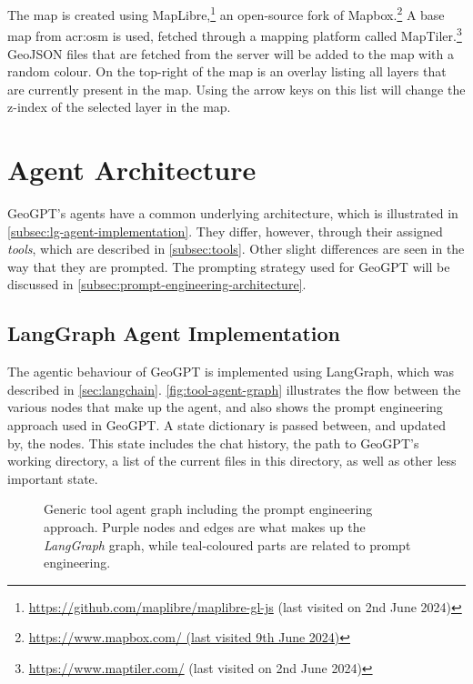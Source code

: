 The map is created using MapLibre,\footnote{\url{https://github.com/maplibre/maplibre-gl-js} (last visited on 2nd June 2024)} an open-source fork of Mapbox.\footnote{\url{https://www.mapbox.com/ (last visited 9th June 2024)}} A base map from \gls{acr:osm} is used, fetched through a mapping platform called MapTiler.\footnote{\url{https://www.maptiler.com/} (last visited on 2nd June 2024)} GeoJSON files that are fetched from the server will be added to the map with a random colour. On the top-right of the map is an overlay listing all layers that are currently present in the map. Using the arrow keys on this list will change the z-index of the selected layer in the map.


\section{Agent Architecture}
\label{sec:agent-architecture}

GeoGPT's agents have a common underlying architecture, which is illustrated in \autoref{subsec:lg-agent-implementation}. They differ, however, through their assigned \textit{tools}, which are described in \autoref{subsec:tools}. Other slight differences are seen in the way that they are prompted. The prompting strategy used for GeoGPT will be discussed in \autoref{subsec:prompt-engineering-architecture}.

\subsection{LangGraph Agent Implementation}
\label{subsec:lg-agent-implementation}

The agentic behaviour of GeoGPT is implemented using LangGraph, which was described in \autoref{sec:langchain}. \autoref{fig:tool-agent-graph} illustrates the flow between the various nodes that make up the agent, and also shows the prompt engineering approach used in GeoGPT. A state dictionary is passed between, and updated by, the nodes. This state includes the chat history, the path to GeoGPT's working directory, a list of the current files in this directory, as well as other less important state.


\begin{figure}
    \centering
    \caption[Generic tool agent graph including the prompt engineering approach]{Generic tool agent graph including the prompt engineering approach. Purple nodes and edges are what makes up the \textit{LangGraph} graph, while teal-coloured parts are related to prompt engineering.}
    \label{fig:tool-agent-graph}
\end{figure}

